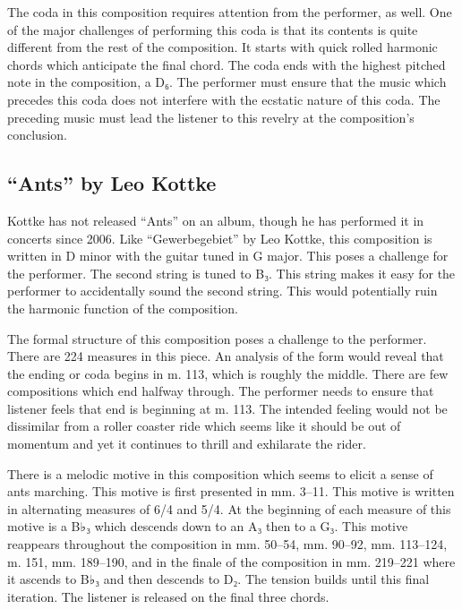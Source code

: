 \documentclass{tufte-handout}
\begin{document}
  The coda in this composition requires attention from the performer, as well. One of the major challenges of performing this coda is that its contents is quite different from the rest of the composition. It starts with quick rolled harmonic chords which anticipate the final chord. The coda ends with the highest pitched note in the composition, a D₆. The performer must ensure that the music which precedes this coda does not interfere with the ecstatic nature of this coda. The preceding music must lead the listener to this revelry at the composition's conclusion. 

\subsection*{``Ants'' by Leo Kottke}
\label{sec:ants-leo-kottke}
Kottke has not released ``Ants'' on an album, though he has performed it in concerts since 2006. Like ``Gewerbegebiet'' by Leo Kottke, this composition is written in D minor with the guitar tuned in G major. This poses a challenge for the performer. The second string is tuned to B₃. This string makes it easy for the performer to accidentally sound the second string. This would potentially ruin the harmonic function of the composition. 

The formal structure of this composition poses a challenge to the
performer. There are 224 measures in this piece. An analysis of the form would
reveal that the ending or coda begins in m. 113, which is roughly the middle. There are few compositions which end halfway through. The
performer needs to ensure that listener feels that end is beginning at
m. 113. The intended feeling would not be dissimilar from a roller coaster
ride which seems like it should be out of momentum and yet it continues to
thrill and exhilarate the rider. 

There is a melodic motive in this composition which seems to elicit a sense of
ants marching. This motive is first presented in mm. 3--11. This motive is
written in alternating measures of 6/4 and 5/4. At the beginning of each
measure of this motive is a B♭₃ which descends down to an A₃ then to a
G₃. This motive reappears throughout the composition in mm. 50--54,
mm. 90--92, mm. 113--124, m. 151, mm. 189--190, and in the finale of the
composition in mm. 219--221 where it ascends to B♭₃ and then descends to
D₂. The tension builds until this final iteration. The listener is released on
the final three chords.
\end{document}
